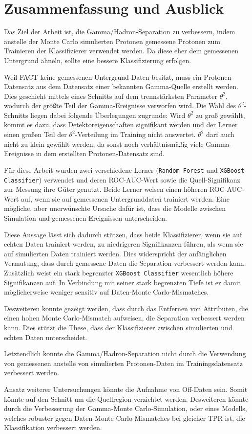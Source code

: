 \chapter{Zusammenfassung und Ausblick}
Das Ziel der Arbeit ist, die Gamma/Hadron-Separation zu verbessern, indem anstelle der Monte Carlo simulierten Protonen gemessene Protonen zum Trainieren der Klassifizierer verwendet werden. 
Da diese eher dem gemessenen Untergrund ähneln, sollte eine bessere Klassifizierung erfolgen.

Weil FACT keine gemessenen Untergrund-Daten besitzt, muss ein Protonen-Datensatz aus dem Datensatz einer bekannten Gamma-Quelle erstellt werden. 
Dies geschieht mittels eines Schnitts auf dem trennstärksten Parameter $\theta^{2}$, wodurch der größte Teil der Gamma-Ereignisse verworfen wird.
Die Wahl des $\theta^{2}$-Schnitts liegen dabei folgende Überlegungen zugrunde:
Wird $\theta^{2}$ zu groß gewählt, kommt es dazu, dass Detektoreigenschaften signifikant werden und der Lerner einen großen Teil der $\theta^{2}$-Verteilung im Training nicht auswertet. 
$\theta^{2}$ darf auch nicht zu klein gewählt werden, da sonst noch verhältnismäßig viele Gamma-Ereignisse in dem erstellten Protonen-Datensatz sind.

Für diese Arbeit wurden zwei verschiedene Lerner (\texttt{Random Forest} und \texttt{XGBoost Classifier}) verwendet und deren ROC-AUC-Wert sowie die Quell-Signifikanz zur Messung ihre Güter genutzt. 
Beide Lerner weisen einen höheren ROC-AUC-Wert auf, wenn sie auf gemessenen Untergrunddaten trainiert werden.
Eine mögliche, aber unerwünschte Ursache dafür ist, dass die Modelle zwischen Simulation und gemessenen Ereignissen unterscheiden.

Diese Aussage lässt sich dadurch stützen, dass beide Klassifizierer, wenn sie auf echten Daten trainiert werden, zu niedrigeren Signifikanzen führen, als wenn sie auf simulierten Daten trainiert werden. 
Dies widerspricht der anfänglichen Vermutung, dass durch gemessene Daten die Separation verbessert werden kann. 
Zusätzlich weist ein stark begrenzter \texttt{XGBoost Classifier} wesentlich höhere Signifikanzen auf. 
In Verbindung mit seiner stark begrenzten Tiefe ist er damit möglicherweise weniger sensitiv auf Daten-Monte Carlo-Mismatches. 

Desweiteren konnte gezeigt werden, dass durch das Entfernen von Attributen, die einen hohen Monte Carlo-Mismatch aufweisen, die Separation verbessert werden kann. 
Dies stützt die These, dass der Klassifizierer zwischen simulierten und echten Daten unterscheidet.

Letztendlich konnte die Gamma/Hadron-Separation nicht durch die Verwendung von gemessenen anstelle von simulierten Protonen-Daten im Trainingsdatensatz verbessert werden. 

Ansatz weiterer Untersuchungen könnte die Aufnahme von Off-Daten sein.
Somit könnte auf den Schnitt um die Quellregion verzichtet werden. 
Desweiteren könnte durch die Verbesserung der Gamma-Monte Carlo-Simulation, oder eines Modells, welches robuster gegen Daten-Monte Carlo Mismatches bei gleicher TPR ist, die Klassifikation verbessert werden.
